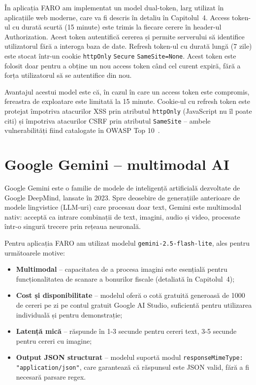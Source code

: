 \documentclass[12pt,a4paper,oneside]{report}
\begin{document}
În aplicația FARO am implementat un model dual-token, larg utilizat în aplicațiile web moderne, care va fi descris în detaliu în Capitolul~4. Access token-ul cu durată scurtă (15 minute) este trimis la fiecare cerere în header-ul Authorization. Acest token autentifică cererea și permite serverului să identifice utilizatorul fără a interoga baza de date. Refresh token-ul cu durată lungă (7 zile) este stocat într-un cookie \texttt{httpOnly} \texttt{Secure} \texttt{SameSite=None}. Acest token este folosit doar pentru a obține un nou access token când cel curent expiră, fără a forța utilizatorul să se autentifice din nou.

Avantajul acestui model este că, în cazul în care un access token este compromis, fereastra de exploatare este limitată la 15 minute. Cookie-ul cu refresh token este protejat împotriva atacurilor XSS prin atributul \texttt{httpOnly} (JavaScript nu îl poate citi) și împotriva atacurilor CSRF prin atributul \texttt{SameSite} -- ambele vulnerabilități fiind catalogate în OWASP Top 10~\cite{ref:owasp}.

\section{Google Gemini -- multimodal AI}

Google Gemini este o familie de modele de inteligență artificială dezvoltate de Google DeepMind, lansate în 2023. Spre deosebire de generațiile anterioare de modele lingvistice (LLM-uri) care procesau doar text, Gemini este multimodal nativ: acceptă ca intrare combinații de text, imagini, audio și video, procesate într-o singură trecere prin rețeaua neuronală. \cite{ref:gemini}

Pentru aplicația FARO am utilizat modelul \texttt{gemini-2.5-flash-lite}, ales pentru următoarele motive:

\begin{itemize}[leftmargin=2cm,itemsep=2pt]
  \item \textbf{Multimodal} -- capacitatea de a procesa imagini este esențială pentru funcționalitatea de scanare a bonurilor fiscale (detaliată în Capitolul~4);
  \item \textbf{Cost și disponibilitate} -- modelul oferă o cotă gratuită generoasă de 1000 de cereri pe zi pe contul gratuit Google AI Studio, suficientă pentru utilizarea individuală și pentru demonstrație;
  \item \textbf{Latență mică} -- răspunde în 1-3 secunde pentru cereri text, 3-5 secunde pentru cereri cu imagine;
  \item \textbf{Output JSON structurat} -- modelul suportă modul \texttt{responseMimeType:} \texttt{"application/\allowbreak json"}, care garantează că răspunsul este JSON valid, fără a fi necesară parsare regex.
\end{itemize}
\end{document}
